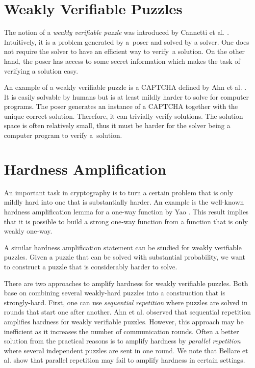 \section{Weakly Verifiable Puzzles}
The notion of a \textit{weakly verifiable puzzle} was introduced by Cannetti et al. \cite{canetti2005hardness}.
Intuitively, it is a problem generated by a~poser and solved by a solver. One does not require the solver to have an efficient way to verify~a solution.
On the other hand, the poser has access to some secret information which makes the task of verifying a solution easy.

An example of a weakly verifiable puzzle is a CAPTCHA defined by Ahn et al. \cite{von2003captcha}.
It is easily solvable by humans but is at least mildly harder to solve for computer programs.
The poser generates an instance of a CAPTCHA together with the unique correct solution.
Therefore, it can trivially verify solutions.
The solution space is often relatively small,
thus it must be harder for the solver being a computer program to verify a~solution.

\section{Hardness Amplification}
An important task in cryptography is to turn a certain problem that is only mildly hard into one that is substantially harder.
An example is the well-known hardness amplification lemma for a one-way function by Yao \cite{yao1982theory}.
This result implies that it is possible to build a strong one-way function from a function that is only weakly one-way.

A similar hardness amplification statement can be studied for weakly verifiable puzzles.
Given a puzzle that can be solved with substantial probability, we want to construct a puzzle that is considerably harder to solve.

There are two approaches to amplify hardness for weakly verifiable puzzles.
Both base on combining several weakly-hard puzzles into a construction that is strongly-hard.
First, one can use \textit{sequential repetition} where puzzles are solved in rounds that start one after another.
Ahn et al. \cite{von2003captcha} observed that sequential repetition amplifies hardness for weakly verifiable puzzles.
However, this approach may be inefficient as it increases the number of communication rounds.
Often a better solution from the practical reasons is to amplify hardness by \textit{parallel repetition}
where several independent puzzles are sent in one round.
We note that Bellare et al. \cite{bellare1997does} show that parallel repetition may fail to amplify hardness in certain settings.


